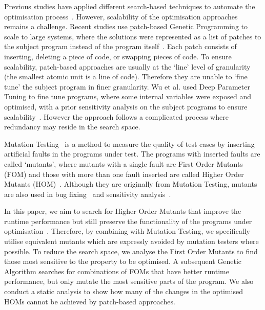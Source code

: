 \documentclass[oribibl]{llncs}
\begin{document}
Previous studies have applied different search-based techniques to automate the optimisation process~\cite{arcuri-ssbse-2011, 6035728,Brake:2008:ADS:1370018.1370031,hutter2009paramils}.
However, scalability of the optimisation approaches remains a challenge.
Recent studies use patch-based Genetic Programming to scale to large systems, where the solutions were represented as a list of patches to the subject program instead of the program itself~\cite{Bruce:2015:REC:2739480.2754752,geneticimprovementJP}.
Each patch consists of inserting, deleting a piece of code, or swapping pieces of code.
To ensure scalability, patch-based approaches are usually at the `line' level of granularity (the smallest atomic unit is a line of code). 
Therefore they are unable to `fine tune' the subject program in finer granularity. 
Wu et al. used Deep Parameter Tuning to fine tune programs, where some internal variables were exposed and optimised, with a prior sensitivity analysis on the subject programs to ensure scalability~\cite{Wu:2015:DPO:2739480.2754648}.
However the approach follows a complicated process where redundancy may reside in the search space.

Mutation Testing~\cite{demillo1978hints,5487526} is a method to measure the quality of test cases by inserting artificial faults in the programs under test.
The programs with inserted faults are called `mutants', where mutants with a single fault are First Order Mutants (FOM) and those with more than one fault inserted are called Higher Order Mutants (HOM)~\cite{Harman:2011:SHO:2025113.2025144}.
Although they are originally from Mutation Testing, mutants are also used in bug fixing~\cite{6035728} and sensitivity analysis~\cite{Wu:2015:DPO:2739480.2754648}.

In this paper, we aim to search for Higher Order Mutants that improve the runtime performance but still preserve the functionality of the programs under optimisation~\cite{Jia:2015:GIU:2739482.2768417}.
Therefore, by combining with Mutation Testing, we specifically utilise equivalent mutants which are expressly avoided by mutation testers where possible.
To reduce the search space, we analyse the First Order Mutants to find those most sensitive to the property to be optimised.
A subsequent Genetic Algorithm searches for combinations of FOMs that have better runtime performance, but only mutate the most sensitive parts of the program.
We also conduct a static analysis to show how many of the changes in the optimised HOMs cannot be achieved by patch-based approaches.
\end{document}
